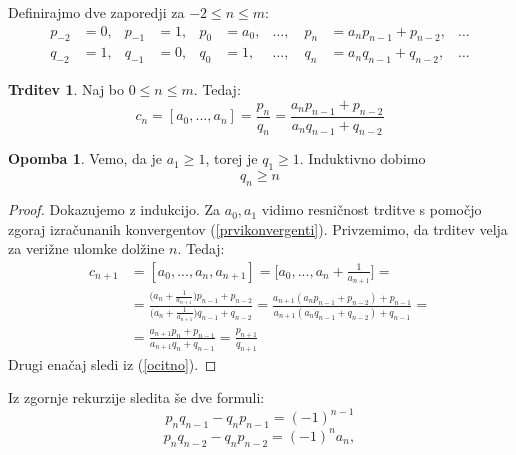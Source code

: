 \documentclass[a4paper,12pt]{article}
\theoremstyle{definition}
\theoremstyle{proposition}
\newtheorem{trd}{Trditev}[section]
\theoremstyle{theorem}
\theoremstyle{lemma}
\newtheorem*{op}{Opomba}
\begin{document}
Definirajmo dve zaporedji za $-2\leq n \leq m$:
\begin{align*}
		p_{-2} &= 0, & p_{-1} &= 1, & p_0 &= a_0, & \dots, \quad p_n &= a_{n}p_{n-1} + p_{n-2}, & \dots \\
		q_{-2} &= 1, & q_{-1} &= 0, & q_0 &= 1, & \dots, \quad q_n &= a_{n}q_{n-1} + q_{n-2}, & \dots
\end{align*}
		
\begin{trd}
Naj bo $0\leq n \leq m$. Tedaj:
\begin{equation}
\label{pninqn}
c_n = [a_0, ..., a_n] = \frac{p_n}{q_n} = \frac{a_{n}p_{n-1} + p_{n-2}}{a_{n}q_{n-1} + q_{n-2}}
\end{equation}
\end{trd}

\begin{op}
Vemo, da je $a_1 \geq 1$, torej je $q_1 \geq 1$. Induktivno dobimo
\begin{equation}
\label{ocenaimenovalca}
q_n \geq n
\end{equation}
\end{op}

\begin{proof}
Dokazujemo z indukcijo. Za $a_0, a_1$ vidimo resničnost trditve s pomočjo zgoraj izračunanih konvergentov (\ref{prvikonvergenti}). Privzemimo, da trditev velja za verižne ulomke dolžine $n$. Tedaj:
\begin{equation*}
\begin{split}
c_{n+1}&=[a_0, ...,a_n, a_{n+1}]
= \Big[a_0, ..., a_n + \frac{1}{a_{n+1}}\Big] =\\
&= \frac{\big(a_n + \frac{1}{a_{n+1}}\big)p_{n-1}+p_{n-2}}{\big(a_n + \frac{1}{a_{n+1}}\big)q_{n-1}+q_{n-2}} =
\frac{a_{n+1}(a_n p_{n-1} + p_{n-2}) + p_{n-1}}{a_{n+1}(a_n q_{n-1} + q_{n-2}) + q_{n-1}} =\\
&=\frac{a_{n+1}p_n + p_{n-1}}{a_{n+1}q_n + q_{n-1}} = \frac{p_{n+1}}{q_{n+1}}
\end{split}
\end{equation*}
Drugi enačaj sledi iz (\ref{ocitno}).
\end{proof}

\vspace{5mm}

Iz zgornje rekurzije sledita še dve formuli:
\begin{equation}
\label{prvaformula}
p_n q_{n-1} - q_n p_{n-1} = (-1)^{n-1}
\end{equation}
\begin{equation}
\label{drugaformula}
p_n q_{n-2} - q_n p_{n-2} = (-1)^n a_n,
\end{equation}
\end{document}
